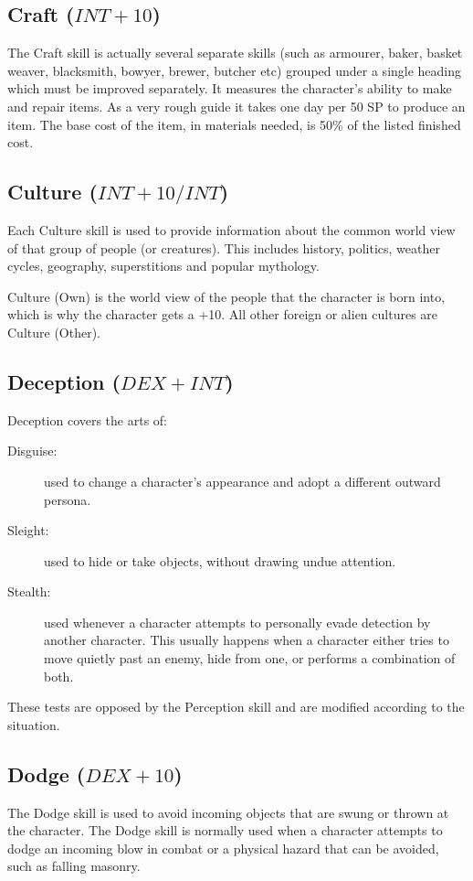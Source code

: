 \subsection{Craft ($INT+10$)}
The Craft skill is actually several separate skills (such as armourer, baker, basket weaver, blacksmith, bowyer, brewer, butcher etc) grouped under a single heading which must be improved separately. It measures the character’s ability to make and repair items.
As a very rough guide it takes one day per 50 SP to produce an item. The base cost of the item, in materials needed, is 50\% of the listed finished cost.

\subsection{Culture ($INT+10/INT$)}
Each Culture skill is used to provide information about the common world view of that group of people (or creatures). This includes history, politics, weather cycles, geography, superstitions and popular mythology. 

Culture (Own) is the world view of the people that the character is born into, which is why the character gets a +10. All other foreign or alien cultures are Culture (Other).

\subsection{Deception ($DEX +INT$)}
Deception covers the arts of:
\begin{description}
	\item[Disguise:] used to change a character’s appearance and adopt a different outward persona. 
	\item[Sleight:] used to hide or take objects, without drawing undue attention. 
	\item[Stealth:] used whenever a character attempts to personally evade detection by another character. This usually happens when a character either tries to move quietly past an enemy, hide from one, or performs a combination of both.
\end{description}

These tests are opposed by the Perception skill and are modified according to the situation. 

\subsection{Dodge ($DEX+10$)}
The Dodge skill is used to avoid incoming objects that are swung or thrown at the character. The Dodge skill is normally used when a character attempts to dodge an incoming blow in combat or a physical hazard that can be avoided, such as falling masonry. 

